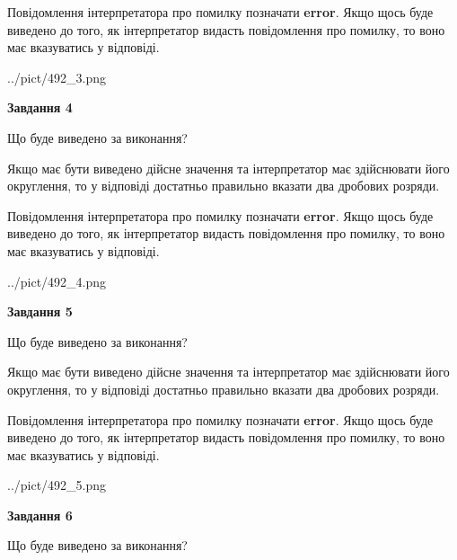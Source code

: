 \documentclass[12pt, ukrainian]{article}
\begin{document}
{\begin {Large}
Повідомлення інтерпретатора про помилку позначати \textbf{error}.
Якщо щось буде виведено до того, як інтерпретатор видасть повідомлення про помилку, 
то воно має вказуватись у відповіді. \par

\begin{center}
	{../pict/492_3.png}
\end{center}
\newpage

{\begin {center}\textbf{Завдання 4}\end {center}}\par
Що буде виведено за виконання? \par

Якщо має бути виведено дійсне значення та інтерпретатор має здійснювати його округлення, 
то у відповіді достатньо правильно вказати два дробових розряди.

Повідомлення інтерпретатора про помилку позначати \textbf{error}.
Якщо щось буде виведено до того, як інтерпретатор видасть повідомлення про помилку, 
то воно має вказуватись у відповіді. \par

\begin{center}
	{../pict/492_4.png}
\end{center}
\newpage

{\begin {center}\textbf{Завдання 5}\end {center}}\par
Що буде виведено за виконання? \par

Якщо має бути виведено дійсне значення та інтерпретатор має здійснювати його округлення, 
то у відповіді достатньо правильно вказати два дробових розряди.

Повідомлення інтерпретатора про помилку позначати \textbf{error}.
Якщо щось буде виведено до того, як інтерпретатор видасть повідомлення про помилку, 
то воно має вказуватись у відповіді. \par

\begin{center}
	{../pict/492_5.png}
\end{center}
\newpage

{\begin {center}\textbf{Завдання 6}\end {center}}\par
Що буде виведено за виконання? \par


\end{Large}}
\end{document}
